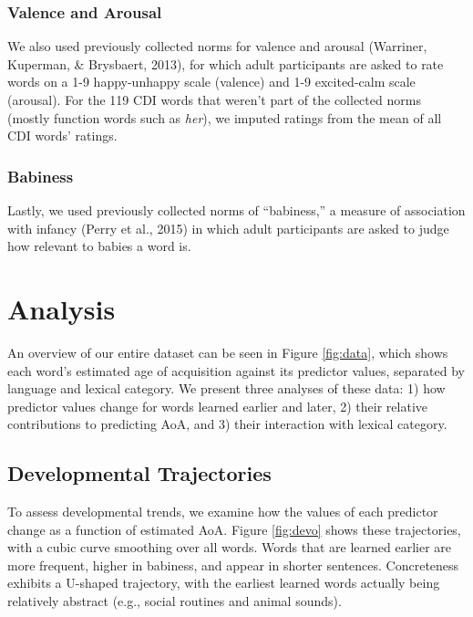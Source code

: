 \documentclass[10pt, letterpaper]{article}
\begin{document}
\subsubsection{Valence and Arousal}\label{valence-and-arousal}

We also used previously collected norms for valence and arousal
(Warriner, Kuperman, \& Brysbaert, 2013), for which adult participants
are asked to rate words on a 1-9 happy-unhappy scale (valence) and 1-9
excited-calm scale (arousal). For the 119 CDI words that weren't part of
the collected norms (mostly function words such as \emph{her}), we
imputed ratings from the mean of all CDI words' ratings.

\subsubsection{Babiness}\label{babiness}

Lastly, we used previously collected norms of ``babiness,'' a measure of
association with infancy (Perry et al., 2015) in which adult
participants are asked to judge how relevant to babies a word is.

\section{Analysis}\label{analysis}

An overview of our entire dataset can be seen in Figure \ref{fig:data},
which shows each word's estimated age of acquisition against its
predictor values, separated by language and lexical category. We present
three analyses of these data: 1) how predictor values change for words
learned earlier and later, 2) their relative contributions to predicting
AoA, and 3) their interaction with lexical category.

\subsection{Developmental
Trajectories}\label{developmental-trajectories}

To assess developmental trends, we examine how the values of each
predictor change as a function of estimated AoA. Figure \ref{fig:devo}
shows these trajectories, with a cubic curve smoothing over all words.
Words that are learned earlier are more frequent, higher in babiness,
and appear in shorter sentences. Concreteness exhibits a U-shaped
trajectory, with the earliest learned words actually being relatively
abstract (e.g., social routines and animal sounds).
\end{document}
